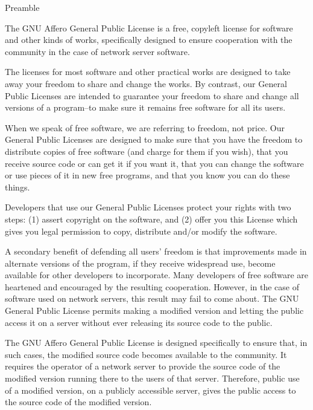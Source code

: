 \documentclass{article}%
\begin{document}
\begin{center}
{\Large Preamble}
\end{center}

\begin{flushleft}
The GNU Affero General Public License is a free, copyleft license
for software and other kinds of works, specifically designed to ensure
cooperation with the community in the case of network server software.

The licenses for most software and other practical works are
designed to take away your freedom to share and change the works.  By
contrast, our General Public Licenses are intended to guarantee your
freedom to share and change all versions of a program--to make sure it
remains free software for all its users.

When we speak of free software, we are referring to freedom, not
price. Our General Public Licenses are designed to make sure that you
have the freedom to distribute copies of free software (and charge for
them if you wish), that you receive source code or can get it if you
want it, that you can change the software or use pieces of it in new
free programs, and that you know you can do these things.

Developers that use our General Public Licenses protect your rights
with two steps: (1) assert copyright on the software, and (2) offer
you this License which gives you legal permission to copy, distribute
and/or modify the software.

A secondary benefit of defending all users' freedom is that
improvements made in alternate versions of the program, if they
receive widespread use, become available for other developers to
incorporate. Many developers of free software are heartened and
encouraged by the resulting cooperation. However, in the case of
software used on network servers, this result may fail to come about.
The GNU General Public License permits making a modified version and
letting the public access it on a server without ever releasing its
source code to the public.

The GNU Affero General Public License is designed specifically to
ensure that, in such cases, the modified source code becomes available
to the community.  It requires the operator of a network server to
provide the source code of the modified version running there to the
users of that server.  Therefore, public use of a modified version, on
a publicly accessible server, gives the public access to the source
code of the modified version.


\end{flushleft}
\end{document}
